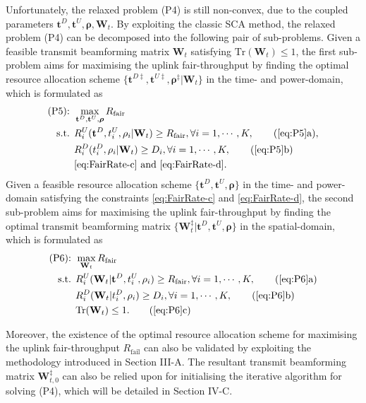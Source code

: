 \documentclass[12pt,draftcls,onecolumn,journal]{IEEEtran}
\begin{document}
Unfortunately, the relaxed problem (P4) is still non-convex, due to the coupled parameters ${\mathbf{t}^D, \mathbf{t}^U, \boldsymbol{\rho}, \mathbf{W}_t}$. By exploiting the classic SCA method, the relaxed problem (P4) can be decomposed into the following pair of sub-problems. Given a feasible transmit beamforming matrix $\mathbf{W}_t$ satisfying $\text{Tr}(\mathbf{W}_t)\leq 1$, the first sub-problem aims for maximising the uplink fair-throughput by finding the optimal resource allocation scheme $\{\mathbf{t}^{D\ddagger}, \mathbf{t}^{U\ddagger}, \boldsymbol{\rho}^{\ddagger} | \mathbf{W}_t\}$ in the time- and power-domain, which is formulated as
\begin{align}
	\text{(P5): } & \max_{\mathbf{t}^D, \mathbf{t}^U, \boldsymbol{\rho}} R_{\text{fair}} \label{eq:P5} \\
	\text{s.t. } & R_i^U(\mathbf{t}^D,t_i^U,\rho_i | \mathbf{W}_t) \geq R_{\text{fair}}, \forall i = 1,\cdots,K, \tag{\ref{eq:P5}a}, \label{eq:P5-a}\\
	& R_i^D(t_i^D,\rho_i | \mathbf{W}_t) \geq D_i, \forall i=1,\cdots,K, \tag{\ref{eq:P5}b} \label{eq:P5-b} \\
	& \text{\eqref{eq:FairRate-c} and \eqref{eq:FairRate-d}}.
\end{align}
Given a feasible resource allocation scheme $\{\mathbf{t}^{D}, \mathbf{t}^{U}, \boldsymbol{\rho}\}$ in the time- and power-domain satisfying the constraints \eqref{eq:FairRate-c} and \eqref{eq:FairRate-d}, the second sub-problem aims for maximising the uplink fair-throughput by finding the optimal transmit beamforming matrix $\{\mathbf{W}_t^{\ddagger} | \mathbf{t}^{D}, \mathbf{t}^{U}, \boldsymbol{\rho}\}$ in the spatial-domain, which is formulated as
\begin{align}
	\text{(P6): } & \max_{\mathbf{W}_t} R_{\text{fair}} \label{eq:P6} \\
	\text{s.t. } & R_i^U(\mathbf{W}_t | \mathbf{t}^D,t_i^U,\rho_i) \geq R_{\text{fair}}, \forall i = 1,\cdots,K, \tag{\ref{eq:P6}a} \label{eq:P6-a}\\
	& R_i^D(\mathbf{W}_t | t_i^D,\rho_i) \geq D_i, \forall i=1,\cdots,K, \tag{\ref{eq:P6}b} \label{eq:P6-b} \\
	&\text{Tr}(\mathbf{W}_t) \leq 1. \tag{\ref{eq:P6}c} \label{eq:P6-c}
\end{align}

Moreover, the existence of the optimal resource allocation scheme for maximising the uplink fair-throughput $R_{\text{fail}}$ can also be validated by exploiting the methodology introduced in Section III-A. The resultant transmit beamforming matrix $\mathbf{W}_{t,0}^{\ddagger}$ can also be relied upon for initialising the iterative algorithm for solving (P4), which will be detailed in Section IV-C. 
\end{document}
